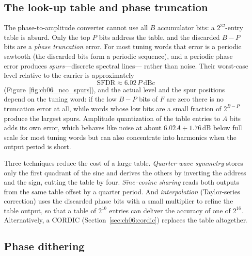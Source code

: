 \subsection{The look-up table and phase truncation}

The phase-to-amplitude converter cannot use all $B$ accumulator bits: a $2^{32}$-entry table is
absurd. Only the top $P$ bits address the table, and the discarded $B-P$ bits are a \emph{phase
truncation} error. For most tuning words that error is a periodic sawtooth (the discarded bits form
a periodic sequence), and a periodic phase error produces \emph{spurs}---discrete spectral lines---
rather than noise. Their worst-case level relative to the carrier is approximately
\begin{equation}
\text{SFDR}\approx6.02\,P\ \text{dBc}
\label{eq:ch06:ncosfdr}
\end{equation}
(Figure~\ref{fig:ch06_nco_spurs}), and the actual level and the spur positions depend on the tuning
word: if the low $B-P$ bits of $F$ are zero there is no truncation error at all, while words whose
low bits are a small fraction of $2^{B-P}$ produce the largest spurs. Amplitude quantization of the
table entries to $A$ bits adds its own error, which behaves like noise at about $6.02A+1.76$\,dB below
full scale for most tuning words but can also concentrate into harmonics when the output period is
short.


Three techniques reduce the cost of a large table. \emph{Quarter-wave symmetry} stores only the first
quadrant of the sine and derives the others by inverting the address and the sign, cutting the table
by four. \emph{Sine--cosine sharing} reads both outputs from the same table offset by a quarter
period. And \emph{interpolation} (Taylor-series correction) uses the discarded phase bits with a
small multiplier to refine the table output, so that a table of $2^{10}$ entries can deliver the
accuracy of one of $2^{16}$. Alternatively, a CORDIC (Section~\ref{sec:ch06:cordic}) replaces the
table altogether.

\subsection{Phase dithering}

